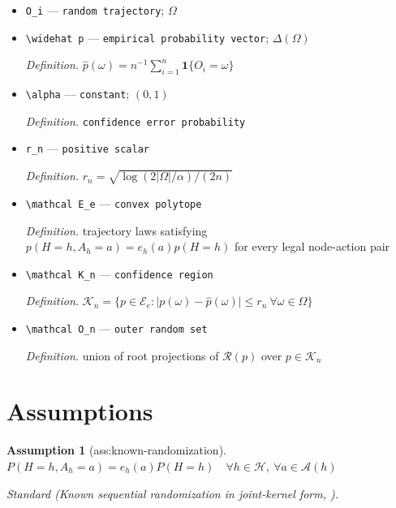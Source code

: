 \documentclass{article}
\newtheorem{assumption}{Assumption}
\begin{document}
\begin{itemize}
  \par\smallskip\noindent\emph{Definition.} \texttt{SMART sample size}
  \item \texttt{O\_\allowbreak{}i} --- \texttt{random trajectory}; \(\Omega\)
  \item \texttt{\textbackslash{}\allowbreak{}widehat p} --- \texttt{empirical probability vector}; \(\Delta(\Omega)\)
  \par\smallskip\noindent\emph{Definition.} \(\widehat p(\omega)=n^{-1}\sum_{i=1}^n\mathbf 1\{O_i=\omega\}\)
  \item \texttt{\textbackslash{}\allowbreak{}alpha} --- \texttt{constant}; \((0,1)\)
  \par\smallskip\noindent\emph{Definition.} \texttt{confidence error probability}
  \item \texttt{r\_\allowbreak{}n} --- \texttt{positive scalar}
  \par\smallskip\noindent\emph{Definition.} \(r_n=\sqrt{\log(2\lvert\Omega\rvert/\alpha)/(2n)}\)
  \item \texttt{\textbackslash{}\allowbreak{}mathcal E\_\allowbreak{}e} --- \texttt{convex polytope}
  \par\smallskip\noindent\emph{Definition.} trajectory laws satisfying \(p(H=h,A_h=a)=e_h(a)p(H=h)\) for every legal node-action pair
  \item \texttt{\textbackslash{}\allowbreak{}mathcal K\_\allowbreak{}n} --- \texttt{confidence region}
  \par\smallskip\noindent\emph{Definition.} \(\mathcal K_n=\{p\in\mathcal E_e:\lvert p(\omega)-\widehat p(\omega)\rvert\leq r_n\ \forall\omega\in\Omega\}\)
  \item \texttt{\textbackslash{}\allowbreak{}mathcal O\_\allowbreak{}n} --- \texttt{outer random set}
  \par\smallskip\noindent\emph{Definition.} union of root projections of \(\mathcal R(p)\) over \(p\in\mathcal K_n\)
\end{itemize}

\section{Assumptions}

\begin{assumption}[ass:known-randomization]\label{ass:known-randomization}
\(P(H=h,A_h=a)=e_h(a)P(H=h)\quad\forall h\in\mathcal H,\ \forall a\in\mathcal A(h)\)
\par\smallskip\noindent\emph{Standard} (Known sequential randomization in joint-kernel form, \cite{Shahn2026Oracle}).
\end{assumption}
\end{document}

